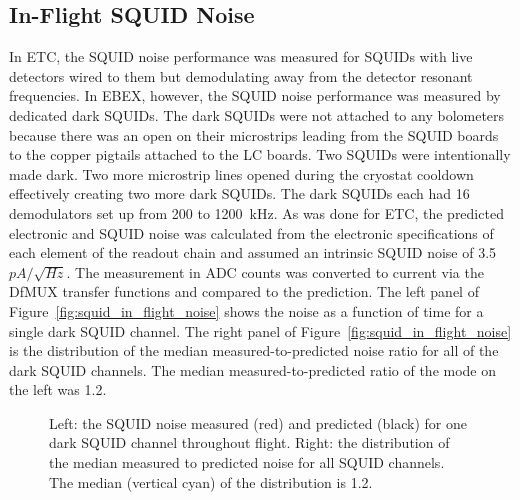 

\subsection{In-Flight SQUID Noise}
\label{sec:flight_squid_noise}

In \ac{ETC}, the \ac{SQUID} noise performance was measured for \ac{SQUID}s with live detectors wired to them but demodulating away from the detector resonant frequencies. 
In \ac{EBEX}, however, the \ac{SQUID} noise performance was measured by dedicated dark \ac{SQUID}s. 
The dark \ac{SQUID}s were not attached to any bolometers because there was an open on their microstrips leading from the \ac{SQUID} boards to the copper pigtails attached to the \ac{LC} boards. 
Two \ac{SQUID}s were intentionally made dark. 
Two more microstrip lines opened during the cryostat cooldown effectively creating two more dark \ac{SQUID}s. 
The dark \ac{SQUID}s each had 16 demodulators set up from 200 to 1200~kHz.
As was done for \ac{ETC}, the predicted electronic and \ac{SQUID} noise was calculated from the electronic specifications of each element of the readout chain and assumed an intrinsic \ac{SQUID} noise of 3.5~$pA/\sqrt{Hz}$. 
The measurement in \ac{ADC} counts was converted to current via the \ac{DfMUX} transfer functions and compared to the prediction. 
The left panel of Figure~\ref{fig:squid_in_flight_noise} shows the noise as a function of time for a single dark \ac{SQUID} channel. 
The right panel of Figure~\ref{fig:squid_in_flight_noise} is the distribution of the median measured-to-predicted noise ratio for all of the dark \ac{SQUID} channels. 
The median measured-to-predicted ratio of the mode on the left was 1.2. 

\begin{figure}[htp]
\begin{center}
\caption[SQUID noise versus time and histogram of all dark squids' median noise]{Left: the \ac{SQUID} noise measured (red) and predicted (black) for one dark \ac{SQUID} channel throughout flight. Right: the distribution of the median measured to predicted noise for all \ac{SQUID} channels. The median (vertical cyan) of the distribution is 1.2. 
\label{fig:squid_in_flight_nosie} }
\end{center}
\end{figure}

